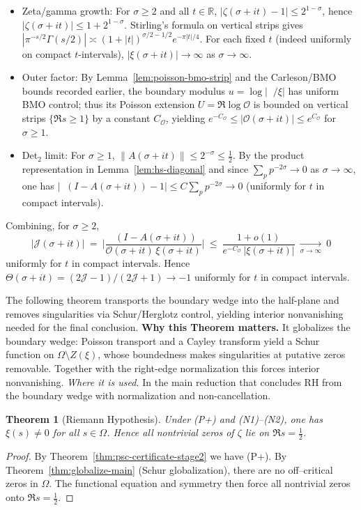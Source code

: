 \documentclass[11pt]{article}
\newtheorem{theorem}{Theorem}[section]
\theoremstyle{definition}
\theoremstyle{remark}
\newcommand{\R}{\mathbb{R}}
\DeclareMathOperator{\dettwo}{det_2}
\begin{document}
\begin{itemize}
\item Zeta/gamma growth: For $\sigma\ge 2$ and all $t\in\R$, $|\zeta(\sigma+it)-1|\le 2^{1-\sigma}$, hence $|\zeta(\sigma+it)|\le 1+2^{1-\sigma}$. Stirling's formula on vertical strips gives $|\pi^{-s/2}\Gamma(s/2)|\asymp (1+|t|)^{\sigma/2-1/2} e^{-\pi|t|/4}$. For each fixed $t$ (indeed uniformly on compact $t$-intervals), $|\xi(\sigma+it)|\to\infty$ as $\sigma\to\infty$.
\item Outer factor: By Lemma~\ref{lem:poisson-bmo-strip} and the Carleson/BMO bounds recorded earlier, the boundary modulus $u=\log|\dettwo/\xi|$ has uniform BMO control; thus its Poisson extension $U=\Re\log\mathcal O$ is bounded on vertical strips $\{\Re s\ge 1\}$ by a constant $C_\mathcal O$, yielding $e^{-C_\mathcal O}\le |\mathcal O(\sigma+it)|\le e^{C_\mathcal O}$ for $\sigma\ge 1$.
\item Det$_2$ limit: For $\sigma\ge 1$, $\|A(\sigma+it)\|\le 2^{-\sigma}\le \tfrac12$. By the product representation in Lemma~\ref{lem:hs-diagonal} and since $\sum_p p^{-2\sigma}\to0$ as $\sigma\to\infty$, one has $|\dettwo(I-A(\sigma+it)) - 1|\le C\sum_p p^{-2\sigma}\to 0$ (uniformly for $t$ in compact intervals).
\end{itemize}
Combining, for $\sigma\ge 2$,
\[
  \big|\mathcal J(\sigma+it)\big|\ =\ \Big|\frac{\dettwo(I-A(\sigma+it))}{\mathcal O(\sigma+it)\,\xi(\sigma+it)}\Big|\ \le\ \frac{1+ o(1)}{e^{-C_\mathcal O}\,|\xi(\sigma+it)|}\ \xrightarrow[\sigma\to\infty]{}\ 0
\]
uniformly for $t$ in compact intervals. Hence $\Theta(\sigma+it)=(2\mathcal J-1)/(2\mathcal J+1)\to -1$ uniformly for $t$ in compact intervals.


\vspace{0.87cm}
\noindent   The following theorem transports the boundary wedge into the half-plane and removes
singularities via Schur/Herglotz control, yielding interior nonvanishing needed for the final conclusion.
\noindent\textbf{Why this Theorem matters.} It globalizes the boundary wedge: Poisson transport and a Cayley transform yield a Schur function on $\Omega\setminus Z(\xi)$, whose boundedness makes singularities at putative zeros removable. Together with the right-edge normalization this forces interior nonvanishing.
\noindent\textit{Where it is used.} In the main reduction that concludes RH from the boundary wedge with normalization and non-cancellation.
\begin{theorem}[Riemann Hypothesis]\label{thm:RH}
Under \textnormal{(P+)} and \textnormal{(N1)}--\textnormal{(N2)}, one has $\xi(s)\neq 0$ for all $s\in\Omega$. Hence all nontrivial zeros of $\zeta$ lie on $\Re s=\tfrac12$.
\end{theorem}
\begin{proof}
By Theorem~\ref{thm:psc-certificate-stage2} we have (P+). By Theorem~\ref{thm:globalize-main} (Schur globalization), there are no off--critical zeros in $\Omega$. The functional equation and symmetry then force all nontrivial zeros onto $\Re s=\tfrac12$.
\end{proof}
\end{document}

